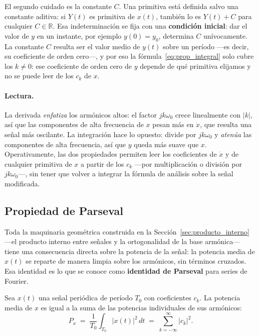 \documentclass[class=book, crop=false]{standalone}
\begin{document}
El segundo cuidado es la constante $C$. Una primitiva está definida
salvo una constante aditiva: si $Y(t)$ es primitiva de $x(t)$,
también lo es $Y(t) + C$ para cualquier $C\in\mathbb{R}$. Esa
indeterminación se fija con una \textbf{condición inicial}: dar el
valor de $y$ en un instante, por ejemplo $y(0) = y_0$, determina
$C$ unívocamente. La constante $C$ resulta ser el valor medio de
$y(t)$ sobre un período ---es decir, su coeficiente de orden
cero---, y por eso la fórmula~\eqref{eq:prop_integral} solo cubre
los $k\neq 0$: ese coeficiente de orden cero de $y$ depende de qué
primitiva elijamos y no se puede leer de los $c_k$ de $x$.

\paragraph{Lectura.}
La derivada \emph{enfatiza} los armónicos altos: el factor
$jk\omega_0$ crece linealmente con $|k|$, así que las componentes
de alta frecuencia de $x$ pesan más en $\dot x$, que resulta una
señal más oscilante. La integración hace lo opuesto: divide por
$jk\omega_0$ y \emph{atenúa} las componentes de alta frecuencia, así que $y$
queda más suave que $x$. Operativamente, las dos propiedades
permiten leer los coeficientes de $\dot x$ y de cualquier primitiva
de $x$ a partir de los $c_k$ ---por multiplicación o división por
$jk\omega_0$---, sin tener que volver a integrar la fórmula de
análisis sobre la señal modificada.

\subsection{Propiedad de Parseval}
\label{subsec:prop_parseval}

Toda la maquinaria geométrica construida en la Sección~\ref{sec:producto_interno} ---el producto
interno entre señales y la ortogonalidad de la base armónica--- tiene
una consecuencia directa sobre la potencia de la señal: la potencia
media de $x(t)$ se reparte de manera limpia sobre los armónicos, sin
términos cruzados. Esa identidad es lo que se conoce como
\textbf{identidad de Parseval} para series de Fourier.

\begin{resultado}
Sea $x(t)$ una señal periódica de período $T_0$ con coeficientes
$c_k$. La potencia media de $x$ es igual a la suma de las potencias
individuales de sus armónicos:
\begin{equation}
    P_x \;=\; \frac{1}{T_0}\int_{T_0} |x(t)|^2\,dt
    \;=\; \sum_{k=-\infty}^{\infty} |c_k|^2.
    \label{eq:parseval}
\end{equation}
\end{resultado}
\end{document}
